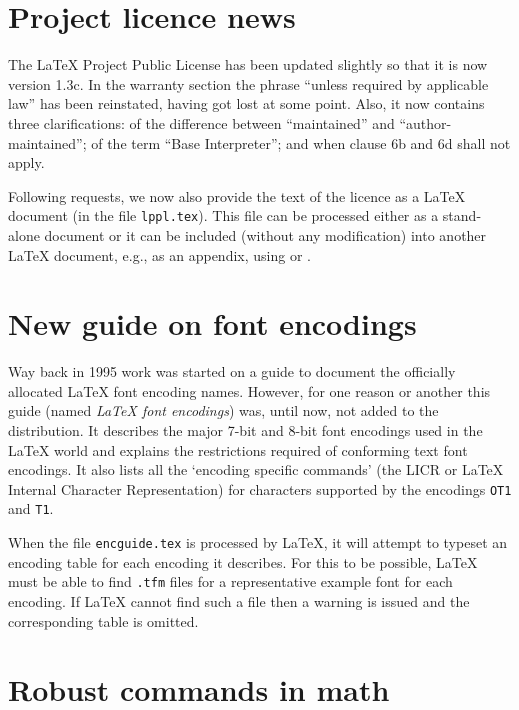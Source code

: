 \documentclass
    [lw35fonts]    %
     {ltnews}[2004/02/28]
\begin{document}
\maketitle


\section{Project licence news}

The \LaTeX{} Project Public License has been updated slightly so that
it is now version 1.3c.  In the warranty section the
phrase ``unless required by applicable law'' has been reinstated,
having got lost at some point.  Also,
it now contains three clarifications: of the difference between
``maintained'' and ``author-maintained''; of the
term ``Base Interpreter''; and when clause 6b and 6d shall not apply.

Following requests, we now also provide the text of the licence as a
\LaTeX{} document (in the file \texttt{lppl.tex}). This file can be
processed either as a stand-alone document or it can be included
(without any modification) into another \LaTeX{} document, e.g., as an
appendix, using \verb|| or \verb||.


\section{New guide on font encodings}

Way back in 1995 work was started on a guide to document the
officially allocated \LaTeX{} font encoding names. However, for one
reason or another this guide (named \textit{\LaTeX{} font encodings})
was, until now, not added to the distribution.  It describes the major
7-bit and 8-bit font encodings used in the \LaTeX{} world and explains
the restrictions required of conforming text font encodings.  It also
lists all the `encoding specific commands' (the LICR or \LaTeX{}
Internal Character Representation) for characters supported by the
encodings \texttt{OT1} and \texttt{T1}.

When the file \texttt{encguide.tex} is processed by \LaTeX{}, it will
attempt to typeset an encoding table for each encoding it describes.
For this to be possible, \LaTeX{} must be able to find \texttt{.tfm}
files for a representative example font for each encoding.  If
\LaTeX{} cannot find such a file then a warning is issued and the
corresponding table is omitted.


\section{Robust commands in math}
\end{document}
